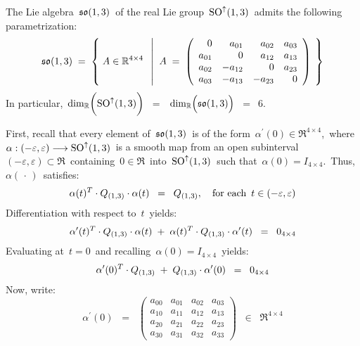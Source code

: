 \vskip 0.5cm
\begin{proposition}[Parametrization of \,$\so(1,3)$]\label{parametrizationLittleSOOneThree}
\mbox{}
\vskip 0.1cm
\noindent
The Lie algebra \,$\so(1,3)$\, of the real Lie group \,$\textnormal{SO}^{\uparrow}(1,3)$\,
admits the following parametrization:
\begin{equation*}
\so{(1,3)}
\; = \;
	\left\{\;
		A
		\overset{{\color{white}.}}{\in}
		\Re^{4 \times 4}
		\;\;\left\vert\;\;
			A \;=\;
			\left(\begin{array}{rrrr}
			        0 &   a_{01} &  a_{02} & a_{03} \\
			a_{01} &           0 &  a_{12} & a_{13} \\
			a_{02} & -a_{12} &           0 & a_{23} \\
			a_{03} & -a_{13} & -a_{23} &          0 \\
			\end{array}\right)
			\right.
		\;\right\}
\end{equation*}
In particular,
\,$\dim_{\Re}\!\left(\overset{{\color{white}.}}{\SO^{\uparrow}(1,3)}\right)$
\,$=$\,
\,$\dim_{\Re}\!\left(\overset{{\color{white}.}}{\so(1,3)}\right)$
\,$=$\, $6$.\,
\end{proposition}
\proof
First, recall that every element of \,$\so(1,3)$\, is of the form \,$\alpha^{\prime}(0) \in \Re^{4 \times 4}$,\,
where
\,$\alpha : (-\varepsilon,\varepsilon) \longrightarrow \textnormal{SO}^{\uparrow}(1,3)$\,
is a smooth map from an open subinterval \,$(-\varepsilon,\varepsilon) \subset \Re$\,
containing \,$0 \in \Re$\, into
\,$\textnormal{SO}^{\uparrow}(1,3)$\,
such that
\,$\alpha(0) = I_{4 \times 4}$.\,
Thus, \,$\alpha(\,\cdot\,)$\, satisfies:
\begin{equation*}
\alpha(t)^{T} \cdot Q_{(1,3)} \cdot \alpha(t) \;\; = \;\; Q_{(1,3)},
\quad
\textnormal{for each \,$t \in (-\varepsilon,\varepsilon)$}
\end{equation*}
Differentiation with respect to \,$t$\, yields:
\begin{equation*}
\alpha^{\prime}(t)^{T} \cdot Q_{(1,3)} \cdot \alpha(t) \;+\; \alpha(t)^{T} \cdot Q_{(1,3)} \cdot \alpha^{\prime}(t) \;\; = \;\; 0_{4 \times 4}
\end{equation*}
Evaluating at \,$t = 0$\, and recalling \,$\alpha(0) = I_{4 \times 4}$\, yields:
\begin{equation*}
\alpha^{\prime}(0)^{T} \cdot Q_{(1,3)} \;+\; Q_{(1,3)} \cdot \alpha^{\prime}(0) \;\; = \;\; 0_{4 \times 4}
\end{equation*}
Now, write:
\begin{equation*}
\alpha^{\prime}(0)
\;\; = \;\;
	\left(\begin{array}{cccc}
	a_{00} & a_{01} & a_{02} & a_{03}
	\\
	a_{10} & a_{11} & a_{12} & a_{13}
	\\
	a_{20} & a_{21} & a_{22} & a_{23}
	\\
	a_{30} & a_{31} & a_{32} & a_{33}
	\end{array}\right)
\;\; \in \;\;
	\Re^{4 \times 4}
\end{equation*}
